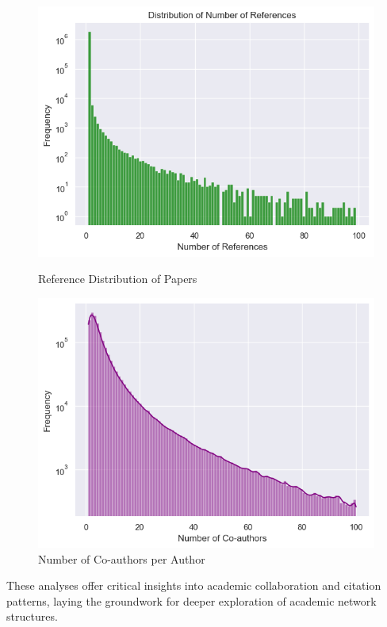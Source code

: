 \documentclass[11pt]{article}
\begin{document}
\begin{figure}[htbp]
\begin{minipage}{0.24\textwidth}
		\includegraphics[width=\textwidth]{img/preprocess/num_references.png}
		\caption{Reference Distribution of Papers}
		\label{fig:reference_distribution}
	\end{minipage} \hfill
	\begin{minipage}{0.24\textwidth}
		\includegraphics[width=\textwidth]{img/preprocess/num_coauthors.png}
		\caption{Number of Co-authors per Author}
		\label{fig:num_coauthors_per_author}
	\end{minipage}
\end{figure}

These analyses offer critical insights into academic collaboration and citation patterns, laying the groundwork for deeper exploration of academic network structures.
\end{document}
